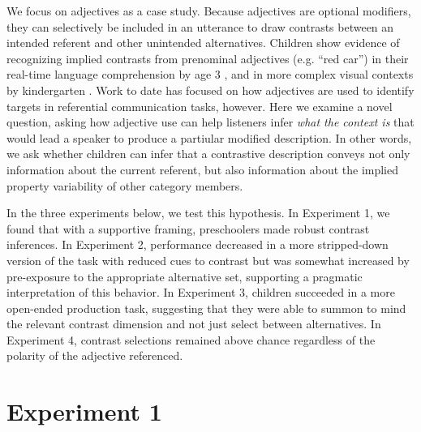 \documentclass[man]{apa2}
\begin{document}
We focus on adjectives as a case study.  Because adjectives are optional modifiers, they can selectively be included in an utterance to draw contrasts between an intended referent and other unintended alternatives. 
Children show evidence of recognizing implied contrasts from prenominal adjectives (e.g. ``red car'') in their real-time language comprehension by age 3 \cite{fernald2010}, and in more complex visual contexts by kindergarten \cite{nadig2002}. Work to date has focused on how adjectives are used to identify targets in referential communication tasks, however.  Here we examine a novel question, asking how adjective use can help listeners infer \emph{what the context is} that would lead a speaker to produce a partiular modified description.  In other words, we ask whether children can infer that a contrastive description conveys not only information about the current referent, but also information about the implied property variability of other category members.

In the three experiments below, we test this hypothesis. In Experiment 1, we found that with a supportive framing, preschoolers made robust contrast inferences.  In Experiment 2, performance decreased in a more stripped-down version of the task with reduced cues to contrast but was somewhat increased by pre-exposure to the appropriate alternative set, supporting a pragmatic interpretation of this behavior. In Experiment 3, children succeeded in a more open-ended production task, suggesting that they were able to summon to mind the relevant contrast dimension and not just select between alternatives. In Experiment 4, contrast selections remained above chance regardless of the polarity of the adjective referenced.

\section{Experiment 1}
\end{document}
